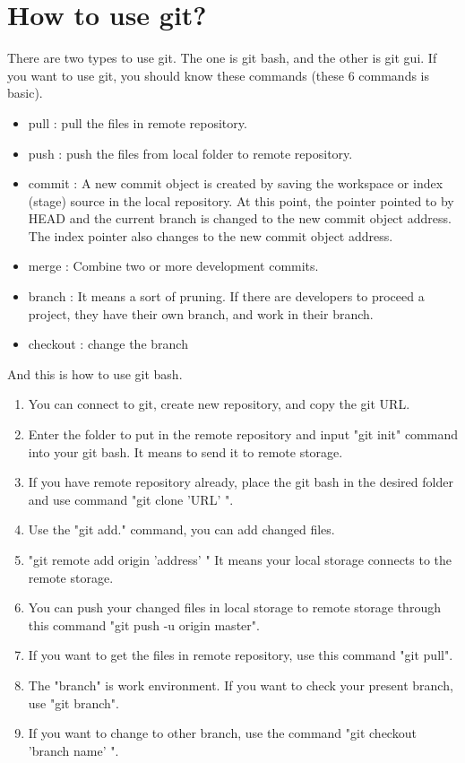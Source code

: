 \documentclass[a4paper]{article}
\begin{document}
\section{How to use git?}
There are two types to use git. The one is git bash, and the other is git gui. If you want to use git, you should know these commands (these 6 commands is basic).
\begin{itemize}
    \item pull : pull the files in remote repository.
    \item push : push the files from local folder to remote repository.
    \item commit : A new commit object is created by saving the workspace or index (stage) source in the local repository. At this point, the pointer pointed to by HEAD and the current branch is changed to the new commit object address. The index pointer also changes to the new commit object address.
    \item merge : Combine two or more development commits.
    \item branch : It means a sort of pruning. If there are developers to proceed a project, they have their own branch, and work in their branch.
    \item checkout : change the branch
\end{itemize}
And this is how to use git bash.
\begin{enumerate}
	\item You can connect to git, create new repository, and copy the git URL.
    \item Enter the folder to put in the remote repository and input "git init" command into your git bash. It means to send it to remote storage.
    \item If you have remote repository already, place the git bash in the desired folder and use command "git clone 'URL' ".
    \item Use the "git add." command, you can add changed files.
    \item "git remote add origin 'address' " It means your local storage connects to the remote storage.
    \item You can push your changed files in local storage to remote storage through this command "git push -u origin master".
    \item If you want to get the files in remote repository, use this command "git pull".
    \item The "branch" is work environment. If you want to check your present branch, use "git branch". 
    \item If you want to change to other branch, use the command "git checkout 'branch name' ".
\end{enumerate}
\end{document}
